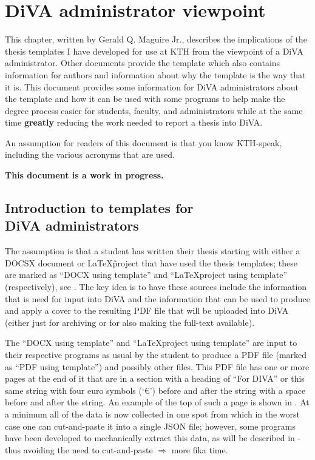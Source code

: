 %
\chapter{DiVA administrator viewpoint}
\label{ch:adminViewpoint}

This chapter, written by Gerald Q. Maguire Jr.,  describes the implications of the thesis templates I have developed for use at KTH from the viewpoint of a DiVA administrator. Other documents provide the template which also contains information for authors and information about why the template is the way that it is. This document provides some information for DiVA administrators about the template and how it can be used with some programs to help make the degree process easier for students, faculty, and administrators while at the same time \textbf{greatly} reducing the work needed to report a thesis into DiVA.

An assumption for readers of this document is that you know KTH-speak, including the various acronyms that are used.

\textbf{This document is a work in progress.}

\section[Introduction to templates for DiVA administrators]{Introduction to templates for\\ DiVA administrators}

The assumption is that a student has written their thesis starting with either a DOCSX document or \LaTeX\~project that have used the thesis templates; these are marked as ``DOCX using template'' and ``\LaTeX project using template'' (respectively), see . The key idea is to have these sources include  \first the information that is need for input into DiVA and \Second the information that can be used to produce and apply a cover to the resulting PDF file that will be uploaded into DiVA (either just for archiving or for also making the full-text available).

The ``DOCX using template'' and ``\LaTeX project using template'' are input to their respective programs as usual by the student to produce a PDF file (marked as ``PDF using template'') and possibly other files. This PDF file has one or more pages at the end of it that are in a section with a heading of ``For DIVA'' or this same string with four euro symbols (\ie `€') before and after the string with a space before and after the string. An example of the top of such a page is shown in .  At a minimum all of the data is now collected in one spot from which in the worst case one can cut-and-paste it into a single JSON file; however, some programs have been developed to mechanically extract this data, as will be described in  - thus avoiding the need to cut-and-paste $\Rightarrow$ more fika time.

